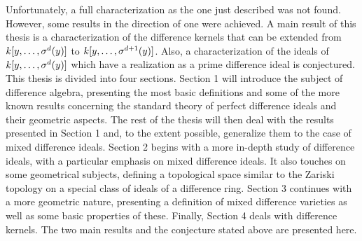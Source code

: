 Unfortunately, a full characterization as the one just described was not found. However, some results in the direction of one were achieved. A main result of this thesis is a characterization of the difference kernels that 
can be extended from $k[y,\ldots,\sigma^d(y)]$ to $k[y,\ldots,\sigma^{d+1}(y)]$. Also, a characterization of the ideals of $k[y,\ldots,\sigma^d(y)]$
which have a realization as a prime difference ideal is conjectured. \\


This thesis is divided into four sections. Section 1 will introduce the subject of difference algebra, presenting the most basic definitions and some of the more known results concerning the standard theory of perfect difference ideals and their geometric aspects.
The rest of the thesis will then deal with the results presented in Section 1 and, to the extent possible, generalize them to the case of mixed difference ideals. 
Section 2 begins with a more in-depth study of difference ideals, with a particular emphasis on mixed difference ideals. It also touches on some geometrical subjects, defining a topological space similar to the Zariski topology on a special class of ideals of a difference ring.
Section 3 continues with a more geometric nature, presenting a definition of mixed difference varieties as well as some basic properties of these. 
Finally, Section 4 deals with difference kernels. The two main results and the conjecture stated above are presented here.
